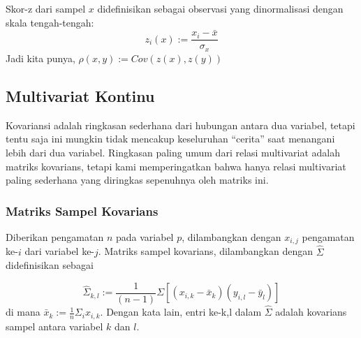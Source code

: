 \documentclass[
]{book}
\newenvironment{Shaded}{\begin{snugshade}}{\end{snugshade}}
\newcommand{\CommentTok}[1]{\textcolor[rgb]{0.56,0.35,0.01}{\textit{#1}}}
\newcommand{\FunctionTok}[1]{\textcolor[rgb]{0.13,0.29,0.53}{\textbf{#1}}}
\newcommand{\NormalTok}[1]{#1}
\newcommand{\OtherTok}[1]{\textcolor[rgb]{0.56,0.35,0.01}{#1}}
\newcommand{\SpecialCharTok}[1]{\textcolor[rgb]{0.81,0.36,0.00}{\textbf{#1}}}
\begin{document}
Skor-z dari sampel \(x\) didefinisikan sebagai observasi yang dinormalisasi dengan skala tengah-tengah:
\[z_i(x):=\frac{x_i-\bar{x}}{\sigma_x}\]
Jadi kita punya, \(\rho(x,y):=Cov(z(x),z(y))\)

\begin{Shaded}
\end{Shaded}

\hypertarget{multivariat-kontinu}{%
\subsection{Multivariat Kontinu}\label{multivariat-kontinu}}

Kovariansi adalah ringkasan sederhana dari hubungan antara dua variabel, tetapi tentu saja ini mungkin tidak mencakup keseluruhan ``cerita'' saat menangani lebih dari dua variabel. Ringkasan paling umum dari relasi multivariat adalah matriks kovarians, tetapi kami memperingatkan bahwa hanya relasi multivariat paling sederhana yang diringkas sepenuhnya oleh matriks ini.

\hypertarget{matriks-sampel-kovarians}{%
\subsubsection*{Matriks Sampel Kovarians}\label{matriks-sampel-kovarians}}

Diberikan pengamatan \(n\) pada variabel \(p\), dilambangkan dengan \(x_{i,j}\) pengamatan ke-\(i\) dari variabel ke-\(j\). Matriks sampel kovarians, dilambangkan dengan \(\hat{\Sigma}\) didefinisikan sebagai

\[\hat{\Sigma}_{k,l}:=\frac{1}{(n-1)}{\Sigma[(x_{i,k}-\bar{x}_k)(y_{i,l}-\bar{y}_l)]}\]
di mana \(\bar{x}_k:=\frac{1}{n}\Sigma_ix_{i,k}\). Dengan kata lain, entri ke-k,l dalam \(\hat{\Sigma}\) adalah kovarians sampel antara variabel \(k\) dan \(l\).
\end{document}
